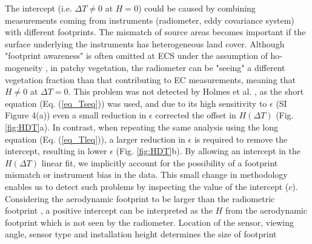 \documentclass[fleqn,10pt]{wlscirep}
\begin{document}
The intercept (i.e. $\Delta T \ne 0$ at $H=0$) could be caused by combining measurements coming from instruments (radiometer, eddy covariance system) with different footprints\cite{marcolla2018geometry}. The mismatch of source areas becomes important if the surface underlying the instruments has heterogeneous land cover. 
 Although "footprint awareness" is often omitted at ECS under the assumption of ho­mogeneity \cite{chu2021representativeness}, in patchy vegetation, the radiometer can be "seeing" a different vegetation fraction than that contributing to EC measurements, meaning that $H\not= 0$ at $\Delta T=0$. This problem was not detected by Holmes et al. \cite{holmes2009land}, as the short equation (Eq. (\ref{eq_Tseq})) was used, and due to its high sensitivity to $\epsilon$ (SI Figure 4(a)) even a small reduction in $\epsilon$ corrected the offset in $H(\Delta T)$ (Fig. \ref{fig:HDT}a). In contrast, when repeating the same analysis using the long equation (Eq. (\ref{eq_Tleq})), a larger reduction in $\epsilon$ is required to remove the intercept, resulting in lower $\epsilon$ (Fig. \ref{fig:HDT}b). By allowing an intercept in the $H(\Delta T)$ linear fit, we implicitly account for the possibility of a footprint mismatch or instrument bias in the data. This small change in methodology enables us to detect such problems by inspecting the value of the intercept ($c$). Considering  the aerodynamic footprint to be larger than the radiometric footprint \cite{marcolla2018geometry,chu2021representativeness}, a positive intercept can be interpreted as the $H$ from the aerodynamic footprint which is not seen by the radiometer. Location of the sensor, viewing angle, sensor type and installation height  determines the size of footprint\cite{marcolla2018geometry, margulis2019joint} 
\end{document}
